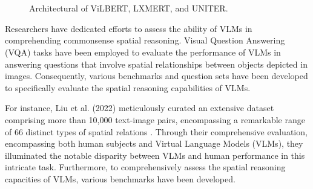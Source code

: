 \documentclass[twocolumn,11pt]{report}
\begin{document}
\begin{figure}[htbp]
    \centering
    \\
    \\
    \caption{Architectural of ViLBERT, LXMERT, and UNITER.}
    \label{fig:VLMs}
\end{figure}

Researchers have dedicated efforts to assess the ability of VLMs in comprehending commonsense spatial reasoning. Visual Question Answering (VQA) tasks have been employed to evaluate the performance of VLMs in answering questions that involve spatial relationships between objects depicted in images\cite{7410636}. Consequently, various benchmarks and question sets have been developed to specifically evaluate the spatial reasoning capabilities of VLMs.

For instance, Liu et al. (2022) meticulously curated an extensive dataset comprising more than 10,000 text-image pairs, encompassing a remarkable range of 66 distinct types of spatial relations \cite{liu2022visual}. Through their comprehensive evaluation, encompassing both human subjects and Virtual Language Models (VLMs), they illuminated the notable disparity between VLMs and human performance in this intricate task. Furthermore, to comprehensively assess the spatial reasoning capacities of VLMs, various benchmarks have been developed.
\end{document}
